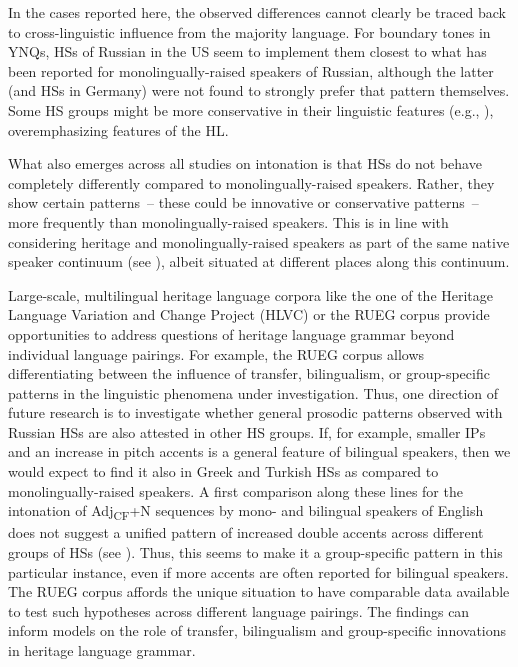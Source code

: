 \documentclass[output=paper,colorlinks,citecolor=brown]{langscibook}
\begin{document}
In the cases reported here, the observed differences cannot clearly be traced back to cross-linguistic influence from the majority language. For boundary tones in YNQs, HSs of Russian in the US seem to implement them closest to what has been reported for monolingually-raised speakers of Russian, although the latter (and HSs in Germany) were not found to strongly prefer that pattern themselves. Some HS groups might be more conservative in their linguistic features (e.g., \cite[129]{Polinsky_2018}), overemphasizing features of the HL.

What also emerges across all studies on intonation is that HSs do not behave completely differently compared to monolingually-raised speakers. Rather, they show certain patterns~-- these could be innovative or conservative patterns~-- more frequently than monolingually-raised speakers. This is in line with considering heritage and monolingually-raised speakers as part of the same native speaker continuum (see \cite{Wiese_etal._2022}), albeit situated at different places along this continuum.

Large-scale, multilingual heritage language corpora like the one of the Heritage Language Variation and Change Project (HLVC) \citep{Nagy_2011} or the RUEG corpus provide opportunities to address questions of heritage language grammar beyond individual language pairings. For example, the RUEG corpus allows differentiating between the influence of transfer, bilingualism, or group-specific patterns in the linguistic phenomena under investigation. Thus, one direction of future research is to investigate whether general prosodic patterns observed with Russian HSs are also attested in other HS groups. If, for example, smaller IPs and an increase in pitch accents is a general feature of bilingual speakers, then we would expect to find it also in Greek and Turkish HSs as compared to monolingually-raised speakers. A first comparison along these lines for the intonation of Adj\textsubscript{CF}+N sequences by mono- and bilingual speakers of English does not suggest a unified pattern of increased double accents across different groups of HSs (see ). Thus, this seems to make it a group-specific pattern in this particular instance, even if more accents are often reported for bilingual speakers. The RUEG corpus affords the unique situation to have comparable data available to test such hypotheses across different language pairings. The findings can inform models on the role of transfer, bilingualism and group-specific innovations in heritage language grammar. 
\end{document}

